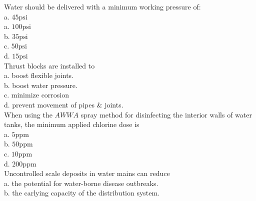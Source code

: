 Water should be delivered with a minimum working pressure of:\\
a. $45 \mathrm{psi}$\\
a. $100 \mathrm{psi}$\\
b. $35 \mathrm{psi}$\\
c. $50 \mathrm{psi}$\\
d. $15 \mathrm{psi}$\\

Thrust blocks are installed to\\
a. boost flexible joints.\\
b. boost water pressure.\\
c. minimize corrosion\\
d. prevent movement of pipes \& joints.\\

When using the $A W W A$ spray method for disinfecting the interior walls of water tanks, the minimum applied chlorine dose is\\
a. $5 \mathrm{ppm}$\\
b. $50 \mathrm{ppm}$\\
c. $10 \mathrm{ppm}$\\
d. $200 \mathrm{ppm}$\\

Uncontrolled scale deposits in water mains can reduce\\
a. the potential for water-borne disease outbreaks.\\
b. the carlying capacity of the distribution system.\\

